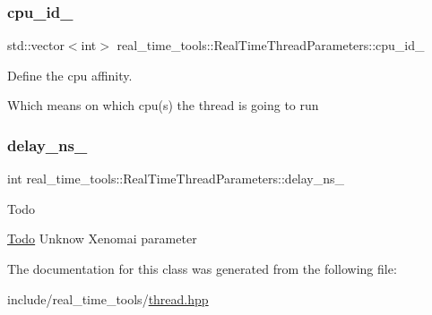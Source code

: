 \subsubsection{\texorpdfstring{cpu\+\_\+id\+\_\+}{cpu\_id\_}}
{\footnotesize\ttfamily std\+::vector$<$int$>$ real\+\_\+time\+\_\+tools\+::\+Real\+Time\+Thread\+Parameters\+::cpu\+\_\+id\+\_\+}



Define the cpu affinity. 

Which means on which cpu(s) the thread is going to run \mbox{\label{classreal__time__tools_1_1RealTimeThreadParameters_a50e8eae41f8284867f073aa802d9afa2}} 
\subsubsection{\texorpdfstring{delay\+\_\+ns\+\_\+}{delay\_ns\_}}
{\footnotesize\ttfamily int real\+\_\+time\+\_\+tools\+::\+Real\+Time\+Thread\+Parameters\+::delay\+\_\+ns\+\_\+}

\begin{DoxyRefDesc}{Todo}
\item[\hyperlink{todo__todo000001}{Todo}]Unknow Xenomai parameter \end{DoxyRefDesc}


The documentation for this class was generated from the following file\+:\begin{DoxyCompactItemize}
\item 
include/real\+\_\+time\+\_\+tools/\hyperlink{thread_8hpp}{thread.\+hpp}\end{DoxyCompactItemize}
